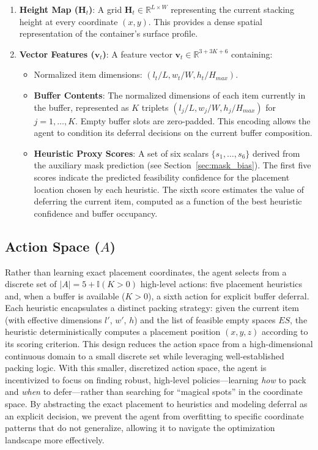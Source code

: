 \documentclass[runningheads]{llncs}
\begin{document}
\begin{enumerate}
    \item \textbf{Height Map ($\mathbf{H}_t$)}: A grid $\mathbf{H}_t \in \mathbb{R}^{L \times W}$ representing the current stacking height at every coordinate $(x, y)$. This provides a dense spatial representation of the container's surface profile.
    \item \textbf{Vector Features ($\mathbf{v}_t$)}: A feature vector $\mathbf{v}_t \in \mathbb{R}^{3 + 3K + 6}$ containing:
    \begin{itemize}
        \item Normalized item dimensions: $(l_t/L, w_t/W, h_t/H_{max})$.
        \item \textbf{Buffer Contents}: The normalized dimensions of each item currently in the buffer, represented as $K$ triplets $(l_j/L, w_j/W, h_j/H_{max})$ for $j = 1, \dots, K$. Empty buffer slots are zero-padded. This encoding allows the agent to condition its deferral decisions on the current buffer composition.
        \item \textbf{Heuristic Proxy Scores}: A set of six scalars $\{s_{1}, \dots, s_{6}\}$ derived from the auxiliary mask prediction (see Section~\ref{sec:mask_bias}). The first five scores indicate the predicted feasibility confidence for the placement location chosen by each heuristic. The sixth score estimates the value of deferring the current item, computed as a function of the best heuristic confidence and buffer occupancy.
    \end{itemize}
\end{enumerate}

\subsection{Action Space ($A$)}
Rather than learning exact placement coordinates, the agent selects from a discrete set of $|A| = 5 + \mathbb{I}(K > 0)$ high-level actions: five placement heuristics and, when a buffer is available ($K > 0$), a sixth action for explicit buffer deferral. Each heuristic encapsulates a distinct packing strategy: given the current item (with effective dimensions $l'$, $w'$, $h$) and the list of feasible empty spaces $ES$, the heuristic deterministically computes a placement position $(x, y, z)$ according to its scoring criterion. This design reduces the action space from a high-dimensional continuous domain to a small discrete set while leveraging well-established packing logic.  With this smaller, discretized action space, the agent is incentivized to focus on finding robust, high-level policies—learning \textit{how} to pack and \textit{when} to defer—rather than searching for ``magical spots'' in the coordinate space. By abstracting the exact placement to heuristics and modeling deferral as an explicit decision, we prevent the agent from overfitting to specific coordinate patterns that do not generalize, allowing it to navigate the optimization landscape more effectively.
\end{document}
